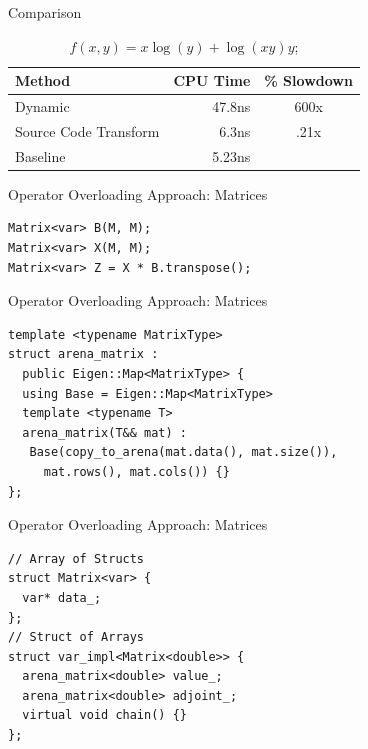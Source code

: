 \documentclass[dvipsnames]{beamer}
\begin{document}

\begin{frame}{Comparison}
\begin{table}
  \centering %
  \caption{$f(x, y) = x\log(y) + \log(xy) y$;} %
  \label{tab:firsttable} %
  \begin{tabular}{|l|r|c|} %
    \hline %
    Method & CPU Time & \% Slowdown \\ %
    \hline %
    Dynamic     & 47.8ns & 600x \\
    Source Code Transform &  6.3ns & .21x \\
    Baseline & 5.23ns & \\
    \hline %
  \end{tabular}
\end{table}
\end{frame}

\begin{frame}[fragile]{Operator Overloading Approach: Matrices}
\begin{verbatim}
Matrix<var> B(M, M);
Matrix<var> X(M, M);
Matrix<var> Z = X * B.transpose();
\end{verbatim}
\end{frame}

\begin{frame}[fragile]{Operator Overloading Approach: Matrices}
\begin{verbatim}
template <typename MatrixType>
struct arena_matrix :
  public Eigen::Map<MatrixType> {
  using Base = Eigen::Map<MatrixType>
  template <typename T>
  arena_matrix(T&& mat) :
   Base(copy_to_arena(mat.data(), mat.size()),
     mat.rows(), mat.cols()) {}
};
\end{verbatim}
\end{frame}

\begin{frame}[fragile]{Operator Overloading Approach: Matrices}
\begin{verbatim}
// Array of Structs
struct Matrix<var> {
  var* data_;
};
// Struct of Arrays
struct var_impl<Matrix<double>> {
  arena_matrix<double> value_;
  arena_matrix<double> adjoint_;
  virtual void chain() {}
};
\end{verbatim}
\vspace{-8mm}
\end{frame}
\end{document}
